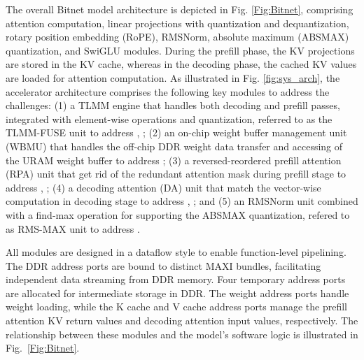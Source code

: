 \documentclass[sigconf]{acmart}
\begin{document}
The overall Bitnet model architecture is depicted in Fig. \ref{Fig:Bitnet}, comprising attention computation, linear projections with quantization and dequantization, rotary position embedding (RoPE), RMSNorm, absolute maximum (ABSMAX) quantization, and SwiGLU modules. During the prefill phase, the KV projections are stored in the KV cache, whereas in the decoding phase, the cached KV values are loaded for attention computation.
As illustrated in Fig. \ref{fig:sys_arch}, the accelerator architecture comprises the following key modules to address the challenges: (1) a TLMM engine that handles both decoding and prefill passes, integrated with element-wise operations and quantization, referred to as the TLMM-FUSE unit to address , ; (2) an on-chip weight buffer management unit (WBMU) that handles the off-chip DDR weight data transfer and accessing of the URAM weight buffer to address ; (3) a reversed-reordered prefill attention (RPA) unit that get rid of the redundant attention mask during prefill stage to address , ; (4) a decoding attention (DA) unit that match the vector-wise computation in decoding stage to address , ; and (5) an RMSNorm unit combined with a find-max operation for supporting the ABSMAX quantization, refered to as RMS-MAX unit to address . 

All modules are designed in a dataflow style to enable function-level pipelining. The DDR address ports are bound to distinct MAXI bundles, facilitating independent data streaming from DDR memory. Four temporary address ports are allocated for intermediate storage in DDR. The weight address ports handle weight loading, while the K cache and V cache address ports manage the prefill attention KV return values and decoding attention input values, respectively. The relationship between these modules and the model's software logic is illustrated in Fig.~\ref{Fig:Bitnet}.



\end{document}
